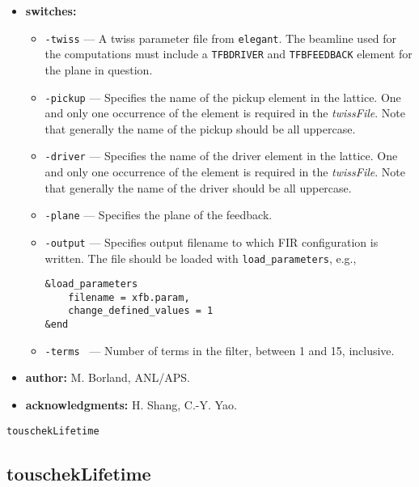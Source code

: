 \documentclass[11pt]{article}
\begin{document}
\begin{itemize}
\item {\bf switches:}
\begin{itemize}
\item {\tt -twiss} --- A twiss parameter file from {\tt elegant}. 
The beamline used for the computations must include a \verb|TFBDRIVER| and
\verb|TFBFEEDBACK| element for the plane in question.
\item {\tt -pickup} --- Specifies the name of the pickup element in the lattice.
  One and only one occurrence of the element is required in the {\em twissFile}.
  Note that generally the name of the pickup should be all uppercase.
\item {\tt -driver} --- Specifies the name of the driver element in the lattice.
  One and only one occurrence of the element is required in the {\em twissFile}.
  Note that generally the name of the driver should be all uppercase.
\item {\tt -plane} --- Specifies the plane of the feedback.
\item {\tt -output} --- Specifies output filename to which FIR configuration is written.
  The file should be loaded with \verb|load_parameters|, e.g.,
\begin{verbatim}
&load_parameters
    filename = xfb.param,
    change_defined_values = 1
&end
\end{verbatim}
\item {\tt -terms } --- Number of terms in the filter, between 1 and 15, inclusive.
\end{itemize}

\item {\bf author:} M. Borland, ANL/APS.

\item {\bf acknowledgments:} H. Shang, C.-Y. Yao.

\end{itemize}


\newpage
\begin{center}{\Large\verb|touschekLifetime|}\end{center}
\subsection{touschekLifetime}
\end{document}
